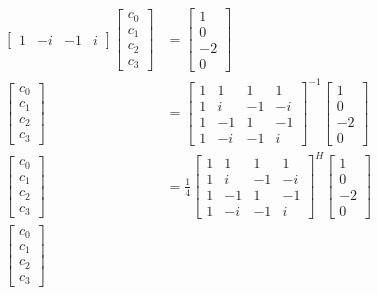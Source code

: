 \documentclass[11pt]{article}       %
\theoremstyle{definition}
\begin{document}
\begin{align*}
\begin{bmatrix}
        1 & -i & -1 & i
    \end{bmatrix}
    \begin{bmatrix}
        c_0 \\ c_1 \\ c_2 \\ c_3
    \end{bmatrix}
    &=
    \begin{bmatrix}
        1 \\ 0 \\ -2 \\ 0
    \end{bmatrix} \\
    \begin{bmatrix}
        c_0 \\ c_1 \\ c_2 \\ c_3
    \end{bmatrix}
    &= \begin{bmatrix}
        1 & 1 & 1 & 1 \\
        1 & i & -1 & -i \\
        1 & -1 & 1 & -1 \\
        1 & -i & -1 & i
    \end{bmatrix}^{-1}
    \begin{bmatrix}
        1 \\ 0 \\ -2 \\ 0
    \end{bmatrix} \\
    \begin{bmatrix}
        c_0 \\ c_1 \\ c_2 \\ c_3
    \end{bmatrix}
    &= \frac14\begin{bmatrix}
        1 & 1 & 1 & 1 \\
        1 & i & -1 & -i \\
        1 & -1 & 1 & -1 \\
        1 & -i & -1 & i
    \end{bmatrix}^{H}
    \begin{bmatrix}
        1 \\ 0 \\ -2 \\ 0
    \end{bmatrix} \\
    \begin{bmatrix}
        c_0 \\ c_1 \\ c_2 \\ c_3

\end{bmatrix}
\end{align*}
\end{document}
